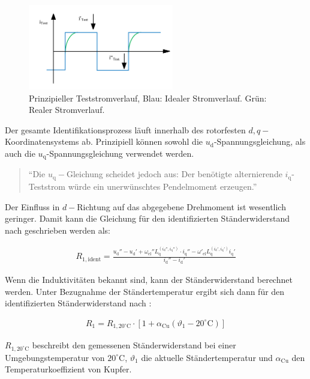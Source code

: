 \documentclass[conference,twocolumn]{IEEEtran}
\newcommand{\x}[1]{\mathrm{#1}}
\begin{document}
\begin{figure}[!h]
\centering
\includegraphics[width=2.5in]{img/test-strom}
\caption{Prinzipieller Teststromverlauf, Blau: Idealer Stromverlauf. Grün: Realer Stromverlauf.}
\label{fig:test-strom}
\end{figure}

Der gesamte Identifikationsprozess läuft innerhalb des rotorfesten $d, q-$Koordinatensystems ab.
Prinzipiell können sowohl die $u_\x{d}$-Spannungsgleichung, als auch die $u_\x{q}$-Spannungsgleichung verwendet werden.

\begin{quote}
\enquote{Die $u_\x{q}-$Gleichung scheidet jedoch aus: Der benötigte alternierende $i_\x{q}$-Teststrom würde ein unerwünschtes Pendelmoment erzeugen.}\autocite[S.~148]{Kellner2012}
\end{quote}

Der Einfluss in $d-$Richtung auf das abgegebene Drehmoment ist wesentlich geringer.
Damit kann die Gleichung für den identifizierten Ständerwiderstand nach \textcite{Kellner2012} geschrieben werden als:

\begin{small}
\begin{align}
R_\x{1,ident} = \frac{u_\x{d}'' - u_\x{d}' + \omega_\x{el}'' L_\x{q}^{(i_\x{d}'',i_\x{q}'')}\cdot i_\x{q}'' - \omega'_\x{el}L_\x{q}^{(i_\x{d}',i_\x{q}')}i_\x{q}'}{i_\x{d}''-i_\x{d}'}
\end{align}
\end{small}

Wenn die Induktivitäten bekannt sind, kann der Ständerwiderstand berechnet werden.
Unter Bezugnahme der Ständertemperatur ergibt sich dann für den identifizierten Ständerwiderstand nach \autocite{Kellner2012}:

\begin{align}
R_\x{1} = R_\x{1,20^{\circ}\x{C}}\cdot \left[ 1 + \alpha_\x{Cu}(\vartheta_\x{1} - 20^{\circ}\x{C})\right]
\end{align}

$R_\x{1,20^{\circ}\x{C}}$ beschreibt den gemessenen Ständerwiderstand bei einer Umgebungstemperatur von $20^{\circ}\x{C}$, $\vartheta_\x{1}$ die aktuelle Ständertemperatur und $\alpha_\x{Cu}$ den Temperaturkoeffizient von Kupfer.
\end{document}
